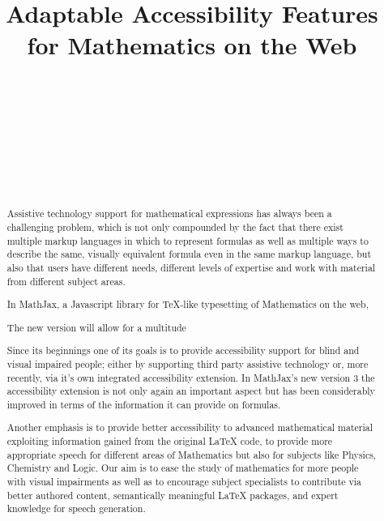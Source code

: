 \documentclass{sig-alternate}
\begin{document}


\title{Adaptable Accessibility Features for Mathematics on the Web}
  

\author{
  \\
  \\
  \\
  \\
  \\
  \\
  \\
}

\maketitle

\begin{abstract}
  Assistive technology support for mathematical expressions has always been a
  challenging problem, which is not only compounded by the fact that there exist
  multiple markup languages in which to represent formulas as well as multiple ways to
  describe the same, visually equivalent formula even in the same markup
  language, but also that users have different needs, different levels of
  expertise and work with material from different subject areas.

  In MathJax, a Javascript library for TeX-like typesetting of Mathematics on the
  web,

  The new version will allow for a multitude 

  Since its beginnings one of its goals is to provide accessibility support for
  blind and visual impaired people; either by supporting third party assistive
  technology or, more recently, via it's own integrated accessibility extension.
In MathJax's new version 3 the accessibility extension is not only again an
important aspect but has been considerably improved in terms of the information
it can provide on formulas.

Another emphasis is to provide better accessibility to advanced mathematical
material exploiting information gained from the original LaTeX code, to provide
more appropriate speech for different areas of Mathematics but also for subjects
like Physics, Chemistry and Logic.  Our aim is to ease the study of mathematics
for more people with visual impairments as well as to encourage subject
specialists to contribute via better authored content, semantically meaningful
LaTeX packages, and expert knowledge for speech generation.
\end{abstract}
\end{document}

